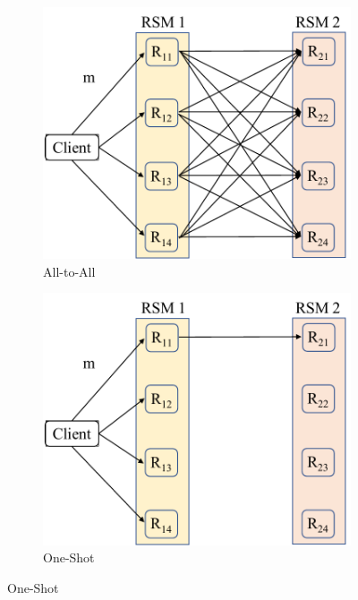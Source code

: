 \begin{figure}[t]
    \centering
    \begin{subfigure}[b]{0.32\columnwidth}
         \centering
         \includegraphics[width=\textwidth]{all-to-all.pdf}
         \caption{All-to-All}
         \label{fig:all-to-all}
     \end{subfigure}%
     \begin{subfigure}[b]{0.32\columnwidth}
         \centering
         \includegraphics[width=\textwidth]{one-shot.pdf}
         \caption{One-Shot}

\end{subfigure}
\end{figure}
